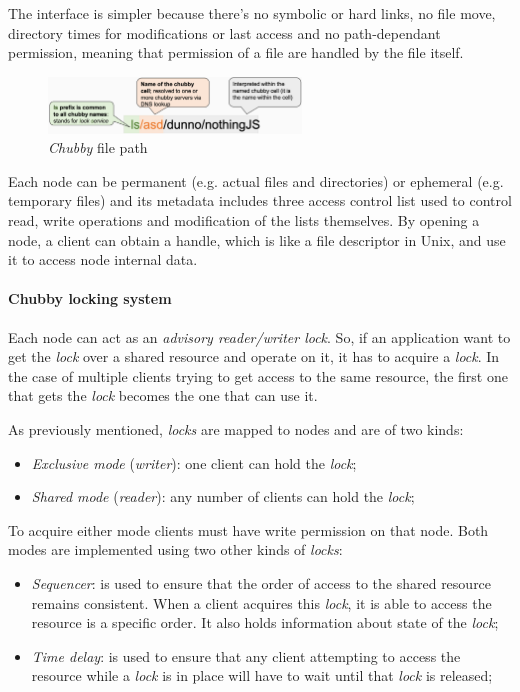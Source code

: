 The interface is simpler because there's no symbolic or hard links, no file move,
directory times for modifications or last access and no path-dependant permission,
meaning that permission of a file are handled by the file itself.

\begin{figure}[h!]
    \centering
    \includegraphics[width=0.6\textwidth]{images/chubby-design-fs.png}
    \caption{\emph{Chubby} file path}
\end{figure}

\noindent
Each node can be permanent (e.g. actual files and directories) or ephemeral
(e.g. temporary files) and its metadata includes three access control list
used to control read, write operations and modification of the lists themselves.
By opening a node, a client can obtain a handle, which is like a file descriptor
in Unix, and use it to access node internal data.

\paragraph{Chubby locking system}
Each node can act as an \emph{advisory reader/writer lock}. So, if an application
want to get the \emph{lock} over a shared resource and operate on it, it has
to acquire a \emph{lock}. In the case of multiple clients trying to get access
to the same resource, the first one that gets the \emph{lock} becomes the one
that can use it.

As previously mentioned, \emph{locks} are mapped to nodes and are of two
kinds:
\begin{itemize}
    \item \emph{Exclusive mode} (\emph{writer}): one client can hold the
    \emph{lock};
    \item \emph{Shared mode} (\emph{reader}): any number of clients can hold
    the \emph{lock};
\end{itemize}
To acquire either mode clients must have write permission on that node.
Both modes are implemented using two other kinds of \emph{locks}:
\begin{itemize}
    \item \emph{Sequencer}: is used to ensure that the order of access to the
    shared resource remains consistent. When a client acquires this \emph{lock},
    it is able to access the resource is a specific order. It also holds
    information about state of the \emph{lock};
    \item \emph{Time delay}: is used to ensure that any client attempting to
    access the resource while a \emph{lock} is in place will have to wait until
    that \emph{lock} is released;
\end{itemize}

